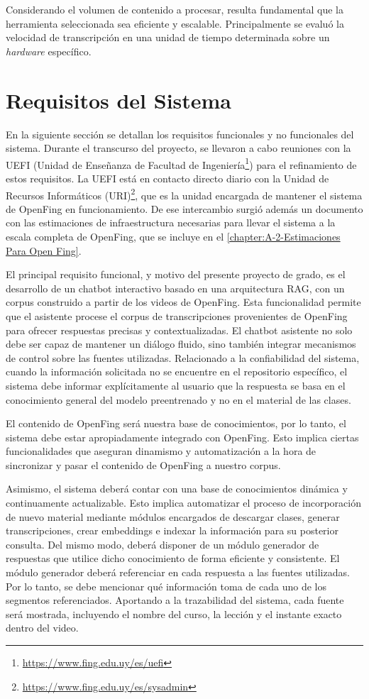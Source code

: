 Considerando el volumen de contenido a procesar, resulta fundamental que la herramienta seleccionada sea eficiente y escalable. Principalmente se evaluó la velocidad de transcripción en una unidad de tiempo determinada sobre un \textit{hardware} específico. 


\section{Requisitos del Sistema}
\label{section:3-Requisitos del Sistema}

En la siguiente sección se detallan los requisitos funcionales y no funcionales del sistema. Durante el transcurso del proyecto, se llevaron a cabo reuniones con la UEFI (Unidad de Enseñanza de Facultad de Ingeniería\footnote{\url{https://www.fing.edu.uy/es/uefi}}) para el refinamiento de estos requisitos. La UEFI está en contacto directo diario con la Unidad de Recursos Informáticos (URI)\footnote{\url{https://www.fing.edu.uy/es/sysadmin}}, que es la unidad encargada de mantener el sistema de OpenFing en funcionamiento. De ese intercambio surgió además un documento con las estimaciones de infraestructura necesarias para llevar el sistema a la escala completa de OpenFing, que se incluye en el \autoref{chapter:A-2-Estimaciones Para Open Fing}.

El principal requisito funcional, y motivo del presente proyecto de grado, es el desarrollo de un chatbot interactivo basado en una arquitectura RAG, con un corpus construido a partir de los videos de OpenFing. Esta funcionalidad permite que el asistente procese el corpus de transcripciones provenientes de OpenFing para ofrecer respuestas precisas y contextualizadas. El chatbot asistente no solo debe ser capaz de mantener un diálogo fluido, sino también integrar mecanismos de control sobre las fuentes utilizadas. Relacionado a la confiabilidad del sistema, cuando la información solicitada no se encuentre en el repositorio específico, el sistema debe informar explícitamente al usuario que la respuesta se basa en el conocimiento general del modelo preentrenado y no en el material de las clases.

El contenido de OpenFing será nuestra base de conocimientos, por lo tanto, el sistema debe estar apropiadamente integrado con OpenFing. Esto implica ciertas funcionalidades que aseguran dinamismo y automatización a la hora de sincronizar y pasar el contenido de OpenFing a nuestro corpus.

Asimismo, el sistema deberá contar con una base de conocimientos dinámica y continuamente actualizable. Esto implica automatizar el proceso de incorporación de nuevo material mediante módulos encargados de descargar clases, generar transcripciones, crear embeddings e indexar la información para su posterior consulta. Del mismo modo, deberá disponer de un módulo generador de respuestas que utilice dicho conocimiento de forma eficiente y consistente. El módulo generador deberá referenciar en cada respuesta a las fuentes utilizadas. Por lo tanto, se debe mencionar qué información toma de cada uno de los segmentos referenciados. Aportando a la trazabilidad del sistema, cada fuente será mostrada, incluyendo el nombre del curso, la lección y el instante exacto dentro del video.

